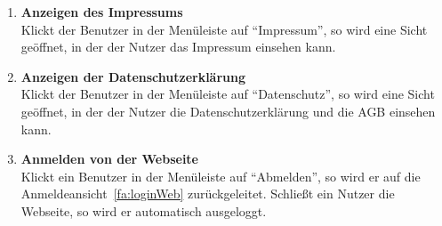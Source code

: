 \begin{enumerate}
\item \label{fa:impressumWeb} \textbf{Anzeigen des Impressums} \hfill \\
Klickt der Benutzer in der Menüleiste auf ``Impressum'', so wird eine Sicht geöffnet, in der der Nutzer das Impressum einsehen kann.

\item \label{fa:datenschutzWeb} \textbf{Anzeigen der Datenschutzerklärung} \hfill \\
Klickt der Benutzer in der Menüleiste auf ``Datenschutz'', so wird eine Sicht geöffnet, in der der Nutzer die Datenschutzerklärung und die AGB einsehen kann.

\item \label{fa:weblogOut}\textbf{Anmelden von der Webseite} \hfill \\
Klickt ein Benutzer in der Menüleiste auf ``Abmelden'', so wird er auf die Anmeldeansicht~\eqref{fa:loginWeb} zurückgeleitet. Schließt ein Nutzer die Webseite, so wird er automatisch ausgeloggt.

\end{enumerate}